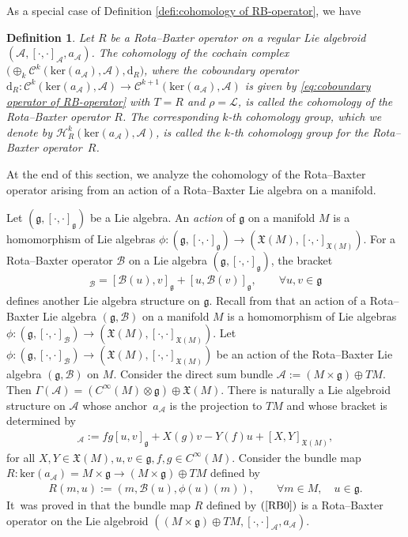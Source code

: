 \documentclass[pdftex]{sigma}%
\numberwithin{equation}{section}
\newtheorem{defi}[thm]{Definition}
\newcommand{\g}{\mathfrak g}
\newcommand{\huaA}{\mathcal{A}}
\newcommand{\huaB}{\mathcal{B}}
\newcommand{\huaC}{\mathcal{C}}
\newcommand{\huaL}{\mathcal{L}}
\newcommand{\huaH}{\mathcal{H}}
\newcommand{\frkX}{\mathfrak X}
\newcommand{\frkg}{\mathfrak g}
\newcommand{\CWM}{C^{\infty}(M)}
\newcommand{\dM}{\mathrm{d}}
\newcommand{\Ker}{\mathrm{ker}}
\begin{document}
As a special case of Definition \ref{defi:cohomology of RB-operator}, we have
\begin{defi}%
 Let $R$ be a Rota--Baxter operator on a regular Lie algebroid $(\huaA,[\cdot,\cdot]_\huaA,a_\huaA)$. The cohomology of the cochain complex $\big({\oplus}_k\huaC^k(\Ker(a_\huaA),\huaA),\dM_R\big)$, where the coboundary operator $\dM_R\colon \huaC^k(\Ker(a_\huaA),\huaA)\to\huaC^{k+1}(\Ker(a_\huaA),\huaA)$ is given by \eqref{eq:coboundary operator of RB-operator} with $T=R$ and $\rho=\huaL$, is called the {\it cohomology of the Rota--Baxter operator} $R$. The corresponding $k$-th cohomology group, which we denote by $\huaH_{R}^k(\Ker(a_\huaA),\huaA)$, is called the {\it $k$-th cohomology group} for the Rota--Baxter operator~$R$.
\end{defi}

At the end of this section, we analyze the cohomology of the Rota--Baxter operator arising from an action of a Rota--Baxter Lie algebra on a manifold.

Let $(\frkg,[\cdot,\cdot]_{\frkg})$ be a Lie algebra. An {\it action}
of $\frkg$ on a manifold $M$ is a homomorphism
of Lie algebras $\phi \colon (\g, [\cdot,\cdot]_\g)\to(\mathfrak{X}(M),[\cdot,\cdot]_{\frkX(M)})$. For a Rota--Baxter operator $\huaB$ on a Lie algebra $(\g,[\cdot,\cdot]_\g)$, the bracket
{\sloppy\begin{gather*}%
 [u,v]_\huaB=[\huaB(u),v]_\g+[u,\huaB(v)]_\g, \qquad \forall u,v\in\g
\end{gather*}
defines another Lie algebra structure on $\g$. Recall from \cite{Rota--Baxter_Lie_algebroid} that an action of a Rota--Baxter Lie algebra $(\g,\huaB)$
 on a manifold $M$ is a homomorphism
of Lie algebras $\phi \colon (\g, [\cdot,\cdot]_\huaB)\to(\mathfrak{X}(M),[\cdot,\cdot]_{\frkX(M)})$.
Let $\phi \colon (\g, [\cdot,\cdot]_\huaB)\to(\mathfrak{X}(M),[\cdot,\cdot]_{\frkX(M)})$ be an action of the Rota--Baxter Lie algebra $(\g,\huaB)$ on $M$. Consider the direct sum bundle $\huaA := (M \times\g)\oplus TM$. Then $\Gamma(\huaA) = (\CWM\otimes\g)\oplus\mathfrak{X}(M)$. There is naturally a Lie algebroid structure on $\huaA$ whose anchor~$a_{\huaA}$ is the projection to $TM$
and whose bracket is determined by
\begin{gather*}%
[fu+X,gv+Y]_{\huaA} := fg[u, v]_\g+X(g)v-Y(f)u+[X,Y]_{{\frkX(M)}},
\end{gather*}}\noindent
for all $X,Y\in\mathfrak{X}(M), u,v\in\g, f,g\in\CWM$. Consider the bundle map $R\colon \Ker(a_\huaA)=M\times\g\to (M\times\g)\oplus TM$ defined by
\begin{gather}\label{RB0}
 R(m,u):=(m,\huaB(u),\phi(u)(m)),\qquad \forall m\in M,\quad u\in\g.
\end{gather}
It~was proved in \cite{Rota--Baxter_Lie_algebroid}
 that the bundle map $R$ defined by $(\ref{RB0})$ is a Rota--Baxter operator on the Lie algebroid $((M \times\g)\oplus TM,[\cdot,\cdot]_{\huaA},a_{\huaA})$.
\end{document}
